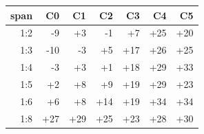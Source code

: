 \begin{tabular}{rrrrrrr}
\toprule
span & C0 & C1 & C2 & C3 & C4 & C5 \\
\midrule
1:2 & -9 & +3 & -1 & +7 & +25 & +20 \\
1:3 & -10 & -3 & +5 & +17 & +26 & +25 \\
1:4 & -3 & +3 & +1 & +18 & +29 & +33 \\
1:5 & +2 & +8 & +9 & +19 & +29 & +23 \\
1:6 & +6 & +8 & +14 & +19 & +34 & +34 \\
1:8 & +27 & +29 & +25 & +23 & +28 & +30 \\
\bottomrule
\end{tabular}
